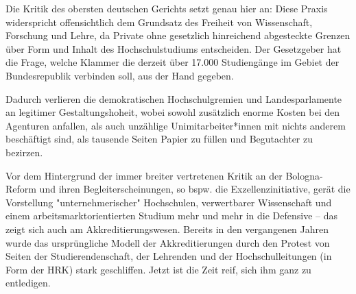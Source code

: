 \documentclass[ngerman,headheight=70pt]{scrartcl}
\begin{document}
    Die Kritik des obersten deutschen Gerichts setzt genau hier an: Diese Praxis
    widerspricht offensichtlich dem Grundsatz des Freiheit von Wissenschaft,
    Forschung und Lehre, da Private ohne gesetzlich hinreichend abgesteckte
    Grenzen über Form und Inhalt des Hochschulstudiums entscheiden. Der Gesetzgeber
    hat die Frage, welche Klammer die derzeit über 17.000 Studiengänge im Gebiet
    der Bundesrepublik verbinden soll, aus der Hand gegeben.

    Dadurch verlieren die demokratischen Hochschulgremien und Landesparlamente
    an legitimer Gestaltungshoheit, wobei sowohl zusätzlich enorme Kosten bei
    den Agenturen anfallen, als auch unzählige Unimitarbeiter*innen mit nichts
    anderem beschäftigt sind, als tausende Seiten Papier zu füllen und Begutachter
    zu bezirzen.

    Vor dem Hintergrund der immer breiter vertretenen Kritik an der Bologna-Reform
    und ihren Begleiterscheinungen, so bspw. die Exzellenzinitiative, gerät die
    Vorstellung "unternehmerischer" Hochschulen, verwertbarer Wissenschaft und
    einem arbeitsmarktorientierten Studium mehr und mehr in die Defensive --
    das zeigt sich auch am Akkreditierungswesen. Bereits in den vergangenen Jahren
    wurde das ursprüngliche Modell der Akkreditierungen durch den Protest von
    Seiten der Studierendenschaft, der Lehrenden und der Hochschulleitungen
    (in Form der HRK) stark geschliffen. Jetzt ist die Zeit reif, sich ihm ganz
    zu entledigen.
\end{document}
